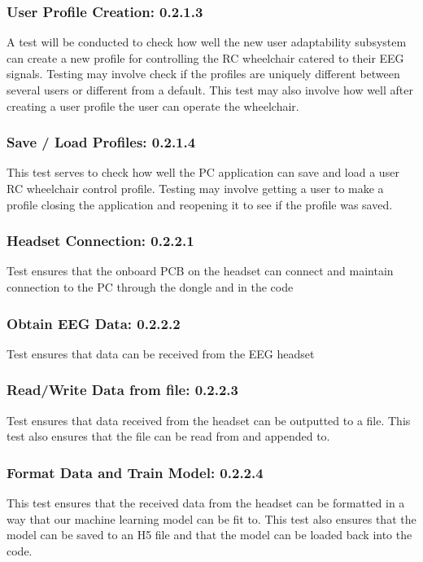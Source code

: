 \documentclass[conference]{IEEEtran}
\begin{document}
        \subsubsection{User Profile Creation: 0.2.1.3}
        A test will be conducted to check how well the new user adaptability subsystem can create a new profile for controlling the RC wheelchair catered to their EEG signals. Testing may involve check if the profiles are uniquely different between several users or different from a default. This test may also involve how well after creating a user profile the user can operate the wheelchair.

        \subsubsection{Save / Load Profiles: 0.2.1.4}
        This test serves to check how well the PC application can save and load a user RC wheelchair control profile. Testing may involve getting a user to make a profile closing the application and reopening it to see if the profile was saved. 

        \subsubsection{Headset Connection: 0.2.2.1}
        Test ensures that the onboard PCB on the headset can connect and maintain connection to the PC through the dongle and in the code 

        \subsubsection{Obtain EEG Data: 0.2.2.2}
        Test ensures that data can be received from the EEG headset

        \subsubsection{Read/Write Data from file: 0.2.2.3}
        Test ensures that data received from the headset can be outputted to a file. This test also ensures that the file can be read from and appended to. 

        \subsubsection{Format Data and Train Model: 0.2.2.4}
        This test ensures that the received data from the headset can be formatted in a way that our machine learning model can be fit to. This test also ensures that the model can be saved to an H5 file and that the model can be loaded back into the code.
\end{document}
